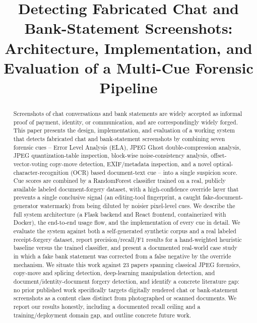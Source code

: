 \documentclass[conference]{IEEEtran}
\begin{document}
\title{Detecting Fabricated Chat and Bank-Statement Screenshots:\\
Architecture, Implementation, and Evaluation of a Multi-Cue Forensic Pipeline}

\author{
}

\maketitle

\begin{abstract}
Screenshots of chat conversations and bank statements are widely accepted as
informal proof of payment, identity, or communication, and are correspondingly
widely forged. This paper presents the design, implementation, and evaluation
of a working system that detects fabricated chat and bank-statement
screenshots by combining seven forensic cues -- Error Level Analysis (ELA),
JPEG Ghost double-compression analysis, JPEG quantization-table inspection,
block-wise noise-consistency analysis, offset-vector-voting copy-move
detection, EXIF/metadata inspection, and a novel optical-character-recognition
(OCR) based document-text cue -- into a single suspicion score. Cue scores
are combined by a RandomForest classifier trained on a real, publicly
available labeled document-forgery dataset, with a high-confidence override
layer that prevents a single conclusive signal (an editing-tool fingerprint,
a caught fake-document-generator watermark) from being diluted by noisier
pixel-level cues. We describe the full system architecture (a Flask backend
and React frontend, containerized with Docker), the end-to-end usage flow, and
the implementation of every cue in detail. We evaluate the system against both
a self-generated synthetic corpus and a real labeled receipt-forgery dataset,
report precision/recall/F1 results for a hand-weighted heuristic baseline
versus the trained classifier, and present a documented real-world case study
in which a fake bank statement was corrected from a false negative by the
override mechanism. We situate this work against 23 papers spanning classical
JPEG forensics, copy-move and splicing detection, deep-learning manipulation
detection, and document/identity-document forgery detection, and identify a
concrete literature gap: no prior published work specifically targets
digitally rendered chat or bank-statement screenshots as a content class
distinct from photographed or scanned documents. We report our results
honestly, including a documented recall ceiling and a training/deployment
domain gap, and outline concrete future work.
\end{abstract}
\end{document}
